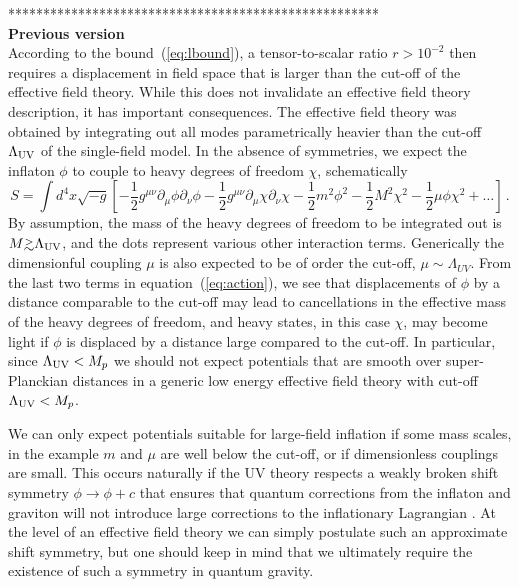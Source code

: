 *****************************************************\\
{\bf Previous version}\\

According to the bound~(\ref{eq:lbound}), a tensor-to-scalar ratio $r>10^{-2}$ then requires a displacement in field space that is larger than the cut-off of the effective field theory. While this does not invalidate an effective field theory description, it has important consequences. The effective field theory was obtained by integrating out all modes parametrically heavier than the cut-off $\Lambda_{\rm UV}$ of the single-field model. In the absence of symmetries, we expect the inflaton $\phi$ to couple to heavy degrees of freedom $\chi$, schematically 
\begin{equation}\label{eq:action}
S=\int d^4x\sqrt{-g}\left[-\frac12g^{\mu\nu}\partial_\mu\phi\partial_\nu\phi-\frac12g^{\mu\nu}\partial_\mu\chi\partial_\nu\chi-\frac12m^2\phi^2-\frac12M^2\chi^2-\frac12\mu\phi\chi^2+\dots\right]\,.
\end{equation}
By assumption, the mass of the heavy degrees of freedom to be integrated out is $M\gtrsim\Lambda_{\rm UV}$, and the dots represent various other interaction terms. Generically the dimensionful coupling $\mu$ is also expected to be of order the cut-off, $\mu\sim\Lambda_{UV}$. From the last two terms in equation~(\ref{eq:action}), we see that displacements of $\phi$ by a distance comparable to the cut-off may lead to cancellations in the effective mass of the heavy degrees of freedom, and heavy states, in this case $\chi$, may become light if $\phi$ is displaced by a distance large compared to the cut-off. In particular, since $\Lambda_{\rm UV}<M_p$ we should not expect potentials that are smooth over super-Planckian distances in a generic low energy effective field theory with cut-off $\Lambda_{\rm UV}<M_p$. 

We can only expect potentials suitable for large-field inflation if some mass scales, in the example $m$ and $\mu$ are well below the cut-off, or if dimensionless couplings are small. This occurs naturally if the UV theory respects a weakly broken shift symmetry $\phi\rightarrow\phi+c$ that ensures that quantum corrections from the inflaton and graviton will not introduce large corrections to the inflationary Lagrangian \cite{Linde:2005ht, Kaloper:2011jz, Csaki:2014bua,Kaplan:2015fuy,Choi:2015fiu}. At the level of an effective field theory we can simply postulate such an approximate shift symmetry, but one should keep in mind that we ultimately require the existence of such a symmetry in quantum gravity. 

